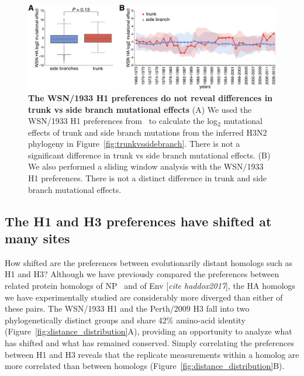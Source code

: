 \documentclass[9pt,twocolumn,twoside]{pnas-new}
\newcommand{\comment}[1]{{\color{red}[\textsl{#1}]}}
\begin{document}
\begin{figure}
\centering
\includegraphics[width=15cm]{figs/WSN_trunkvssidebranch/WSN_trunkvssidebranch.pdf}
\caption{\label{fig:WSN_trunkvssidebranch}
{\bf The WSN/1933 H1 preferences do not reveal differences in trunk vs side branch mutational effects}
(A) We used the WSN/1933 H1 preferences from~\cite{doud2016accurate} to calculate the log$_{2}$ mutational effects of trunk and side branch mutations from the inferred H3N2 phylogeny in Figure~\ref{fig:trunkvssidebranch}.
There is not a significant difference in trunk vs side branch mutational effects.
(B) We also performed a sliding window analysis with the WSN/1933 H1 preferences.
There is not a distinct difference in trunk and side branch mutational effects.
}
\end{figure}

\subsection*{The H1 and H3 preferences have shifted at many sites}
How shifted are the preferences between evolutionarily distant homologs such as H1 and H3?
Although we have previously compared the preferences between related protein homologs of NP~\citep{doud2015site} and of Env \comment{cite haddox2017}, the HA homologs we have experimentally studied are considerably more diverged than either of these pairs.
The WSN/1933 H1 and the Perth/2009 H3 fall into two phylogenetically distinct groups and share 42\% amino-acid identity (Figure~\ref{fig:distance_distribution}A), providing an opportunity to analyze what has shifted and what has remained conserved.
Simply correlating the preferences between H1 and H3 reveals that the replicate measurements within a homolog are more correlated than between homologs (Figure~\ref{fig:distance_distribution}B).
\end{document}
